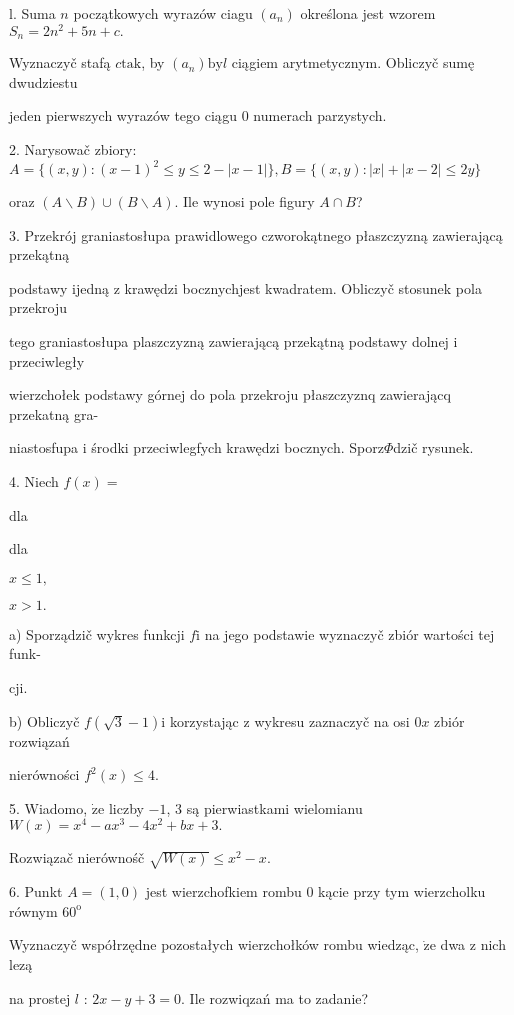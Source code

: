 \documentclass[a4paper,12pt]{article}
\begin{document}
l. Suma $n$ początkowych wyrazów ciagu $(a_{n})$ określona jest wzorem $S_{n} =2n^{2}+5n+c.$

Wyznaczyč stafą $c\mathrm{t}\mathrm{a}\mathrm{k}$, by $(a_{n})\mathrm{b}\mathrm{y}l$ ciągiem arytmetycznym. Obliczyč sumę dwudziestu

jeden pierwszych wyrazów tego ciągu $0$ numerach parzystych.

2. Narysowač zbiory: $A=\{(x,y):(x-1)^{2}\leq y\leq 2-|x-1|\}, B=\{(x,y):|x|+|x-2|\leq 2y\}$

oraz $(A\backslash B)\cup(B\backslash A)$. Ile wynosi pole figury $A\cap B$?

3. Przekrój graniastosłupa prawidlowego czworokątnego płaszczyzną zawierającą przekątną

podstawy ijedną $\mathrm{z}$ krawędzi bocznychjest kwadratem. Obliczyč stosunek pola przekroju

tego graniastosłupa plaszczyzną zawierającą przekątną podstawy dolnej $\mathrm{i}$ przeciwległy

wierzchołek podstawy górnej do pola przekroju płaszczyznq zawierającq przekatną gra-

niastosfupa $\mathrm{i}$ środki przeciwlegfych krawędzi bocznych. Sporz$\Phi$dzič rysunek.

4. Niech $f(x)=$

dla

dla

$x\leq 1,$

$x>1.$

a) Sporządzič wykres funkcji $f\mathrm{i}$ na jego podstawie wyznaczyč zbiór wartości tej funk-

cji.

b) Obliczyč $f(\sqrt{3}-1) \mathrm{i}$ korzystając $\mathrm{z}$ wykresu zaznaczyč na osi $0x$ zbiór rozwiązań

nierówności $f^{2}(x)\leq 4.$

5. Wiadomo, $\dot{\mathrm{z}}\mathrm{e}$ liczby $-1$, 3 są pierwiastkami wielomianu $W(x)=x^{4}-ax^{3}-4x^{2}+bx+3.$

Rozwiązač nierównośč $\sqrt{W(x)}\leq x^{2}-x.$

6. Punkt $A=(1,0)$ jest wierzchofkiem rombu $0$ kącie przy tym wierzcholku równym $60^{\mathrm{o}}$

Wyznaczyč współrzędne pozostałych wierzchołków rombu wiedząc, $\dot{\mathrm{z}}\mathrm{e}$ dwa $\mathrm{z}$ nich lezą

na prostej $l$ : $2x-y+3=0$. Ile rozwiqzań ma to zadanie?
\end{document}
